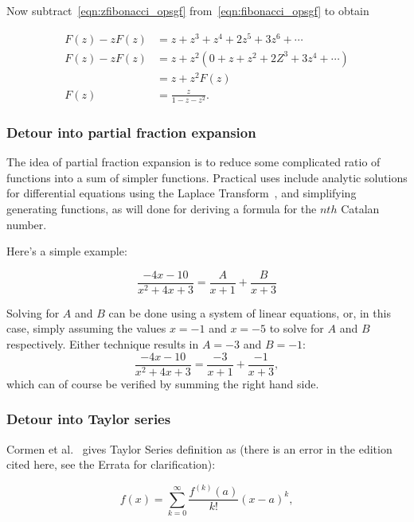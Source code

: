\documentclass{article}
\begin{document}
Now subtract~\ref{eqn:zfibonacci_opsgf} from~\ref{eqn:fibonacci_opsgf} to
obtain

\begin{align}
F(z) - zF(z) & = z + z^3 + z^4 + 2z^5 + 3z^6 +\cdots\\
F(z) - zF(z) & = z + z^2(0 + z + z^2 + 2Z^3 + 3z^4 +\cdots)\\
             & = z + z^2F(z)\\
        F(z) & = \frac{z}{1-z-z^2}.
\end{align}


\subsubsection{Detour into partial fraction expansion}

The idea of partial fraction expansion is to reduce some
complicated ratio of functions into a sum of simpler functions.
Practical uses include analytic solutions for differential equations
using the Laplace Transform~\cite[p. 347]{nagle:rk1989}, and simplifying
generating functions, as will done for deriving a formula for the
$nth$ Catalan number.

Here's a simple example:

\begin{equation}
\frac{-4x-10}{x^2+4x+3} = \frac{A}{x+1} + \frac{B}{x+3}
\end{equation}

Solving for $A$ and $B$ can be done using a system of linear equations,
or, in this case, simply assuming the values $x = -1$ and $x = -5$
to solve for $A$ and $B$ respectively. Either technique results in $A = -3$ and
$B = -1$:
\begin{equation}
\frac{-4x-10}{x^2+4x+3} = \frac{-3}{x+1} + \frac{-1}{x+3},
\end{equation}
which can of course be verified by summing the right hand side.


\subsubsection{Detour into Taylor series}

Cormen et al.~\cite[p. 262]{cormen:th:1990} gives Taylor Series definition as
(there is an error in the edition cited here, see the Errata for clarification):

\begin{equation}
f(x) = \sum_{k=0}^{\infty} \frac{f^{(k)}(a)}{k!}(x-a)^k,
\end{equation}
\end{document}
